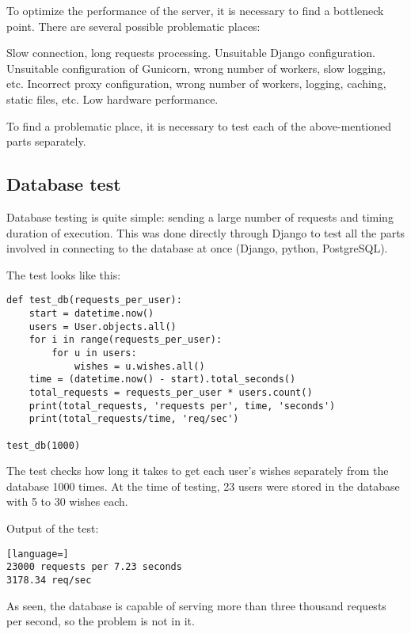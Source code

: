 To optimize the performance of the server, it is necessary to find a bottleneck point. There are several possible
problematic places:

\begin{itemize}
 Slow connection, long requests processing.
 Unsuitable Django configuration.
 Unsuitable configuration of Gunicorn, wrong number of workers, slow logging, etc.
 Incorrect proxy configuration, wrong number of workers, logging, caching, static files, etc.
 Low hardware performance.
\end{itemize}

To find a problematic place, it is necessary to test each of the above-mentioned parts separately.

\subsection{Database test}
Database testing is quite simple: sending a large number of requests and timing duration of execution. This was done
directly through Django to test all the parts involved in connecting to the database at once (Django, python,
PostgreSQL).

The test looks like this:

\begin{lstlisting}
def test_db(requests_per_user):
    start = datetime.now()
    users = User.objects.all()
    for i in range(requests_per_user):
        for u in users:
            wishes = u.wishes.all()
    time = (datetime.now() - start).total_seconds()
    total_requests = requests_per_user * users.count()
    print(total_requests, 'requests per', time, 'seconds')
    print(total_requests/time, 'req/sec')

test_db(1000)
\end{lstlisting}

The test checks how long it takes to get each user's wishes separately from the database 1000 times. At the time of
testing, 23 users were stored in the database with 5 to 30 wishes each.

Output of the test:

\begin{lstlisting}[language=]
23000 requests per 7.23 seconds
3178.34 req/sec
\end{lstlisting}

As seen, the database is capable of serving more than three thousand requests per second, so the problem is not in it.


